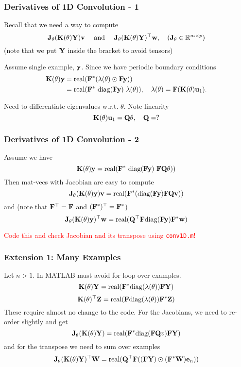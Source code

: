 \documentclass[12pt,fleqn,handout]{beamer}
\begin{document}
\begin{frame}\frametitle{Derivatives of 1D Convolution - 1}
	Recall that we need a way to compute
	$$
		{\bf J}_\theta ({\bf K}(\theta){\bf Y}) {\bf v} \quad \text{ and } \quad {\bf J}_\theta ({\bf K}(\theta){\bf Y})^\top {\bf w}, \quad ({\bf J}_\theta \in\mathbb{R}^{m \times p})
	$$
	(note that we put ${\bf Y}$ inside the bracket to avoid tensors)

	\bigskip
	\pause
	
	Assume single example, ${\bf y}$. Since we have periodic boundary conditions
	\begin{equation*}
		\begin{split}
	   {\bf K}(\theta){\bf y} & =  {\rm real}({\bf F}^*( \lambda(\theta) \odot {\bf F} {\bf y})) \\
	                     & = {\rm real}( {\bf F}^* \ {\rm diag}({\bf F} {\bf y}) \ \lambda(\theta)), \quad 		\lambda(\theta) = {\bf F}({\bf K}(\theta){\bf u}_1).
		\end{split}
	\end{equation*}
	\pause
	
	Need to differentiate eigenvalues w.r.t. $\theta$. Note linearity
	$$
		{\bf K}(\theta) {\bf u}_1 = {\bf Q} \theta, \quad {\bf Q} = ?
	$$
	
\end{frame}

\begin{frame} \frametitle{Derivatives of 1D Convolution - 2}
	Assume we have
	$$
		{\bf K}(\theta) {\bf y}  = {\rm real}( {\bf F}^* \ {\rm diag}({\bf F} {\bf y}) \ {\bf F} {\bf Q} \theta))
	$$
	Then mat-vecs with Jacobian are easy to compute
	$$
		{\bf J}_\theta ( {\bf K}(\theta) {\bf y}) {\bf v} = {\rm real}( {\bf F}^* ({\rm diag}({\bf F} {\bf y})  {\bf F} {\bf Q} {\bf v}))
	$$
	\pause
	and (note that ${\bf F}^\top = {\bf F}$ and $({\bf F}^*)^\top = {\bf F}^*$)
	$$
		{\bf J}_\theta ({\bf K}(\theta) {\bf y})^\top {\bf w} = {\rm real}({\bf Q}^\top {\bf F}  {\rm diag}({\bf F} {\bf y}){\bf F}^* {\bf w})
	$$
	
	\bigskip
	\pause
	
	\begin{center}
		\textcolor{red}{Code this and check Jacobian and its transpose using \texttt{conv1D.m}!}
	\end{center}
	
\end{frame}

\begin{frame}
	\frametitle{Extension 1: Many Examples}
	
	Let $n>1$. In MATLAB must avoid for-loop over examples. 
	$$
		{\bf K}(\theta){\bf Y} =  {\rm real}({\bf F}^* {\rm diag}(\lambda(\theta)) {\bf F} {\bf Y})
	$$
	$$
		 {\bf K}(\theta)^\top{\bf Z} =  {\rm real}({\bf F} {\rm diag}(\lambda(\theta)) {\bf F}^* {\bf Z})
	$$
	These require almost no change to the code. For the Jacobians, we need to re-order slightly and get
	$$
		{\bf J}_\theta ({\bf K}(\theta){\bf Y}) = {\rm real}({\bf F}^* {\rm diag}({\bf F} {\bf Q} v) {\bf F} {\bf Y})
	$$
	and for the transpose we need to sum over examples
	$$
		{\bf J}_\theta({\bf K}(\theta){\bf Y})^\top{\bf W} = {\rm real}({\bf Q}^\top {\bf F}  (({\bf F}{\bf Y}) \odot ({\bf F}^* {\bf W}) {\bf e}_n))
	$$
	
\end{frame}
\end{document}
